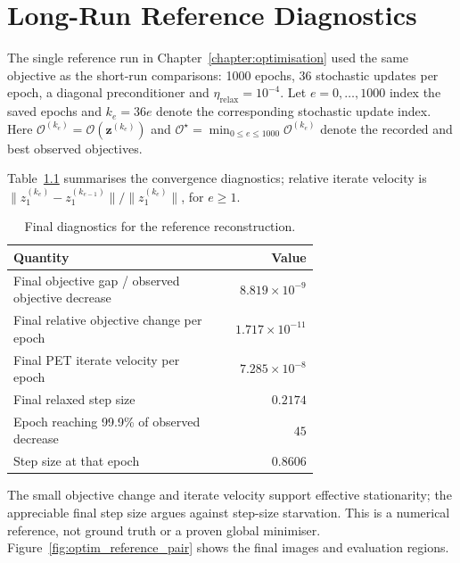 \chapter{Long-Run Reference Diagnostics}
\label{app:baseline_convergence}

The single reference run in Chapter~\ref{chapter:optimisation} used the same objective as the short-run comparisons: 1000 epochs, 36 stochastic updates per epoch, a diagonal preconditioner and $\eta_{\mathrm{relax}}=10^{-4}$. Let $e=0,\ldots,1000$ index the saved epochs and $k_e=36e$ denote the corresponding stochastic update index. Here $\mathcal O^{(k_e)}=\mathcal O(\bm z^{(k_e)})$ and $\mathcal O^\star=\min_{0\leq e\leq1000}\mathcal O^{(k_e)}$ denote the recorded and best observed objectives.

Table~\ref{tab:app_baseline_stationarity} summarises the convergence diagnostics;
relative  iterate velocity is
$\lVert z_1^{(k_e)}-z_1^{(k_{e-1})}\rVert/\lVert z_1^{(k_e)}\rVert$, for $e\geq1$.

\begin{table}[htbp]
    \centering
    \caption{Final diagnostics for the reference reconstruction.}
    \label{tab:app_baseline_stationarity}
    \small
    \begin{tabular}{p{0.68\linewidth}r}
        \toprule
        Quantity & Value\\
        \midrule
        Final objective gap / observed objective decrease & $8.819\times10^{-9}$\\
        Final relative objective change per epoch & $1.717\times10^{-11}$\\
        Final PET iterate velocity per epoch & $7.285\times10^{-8}$\\
        Final relaxed step size & $0.2174$\\
        Epoch reaching 99.9\% of observed decrease & $45$\\
        Step size at that epoch & $0.8606$\\
        \bottomrule
    \end{tabular}
\end{table}

The small objective change and iterate velocity support effective stationarity; the appreciable final step size argues against step-size starvation. This is a numerical reference, not ground truth or a proven global minimiser. Figure~\ref{fig:optim_reference_pair} shows the final images and evaluation regions.
